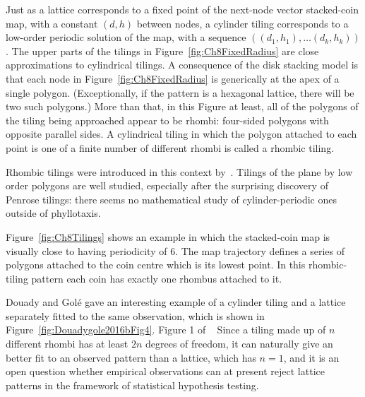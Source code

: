 Just as a lattice corresponds to a fixed point of the next-node vector stacked-coin map, with a constant $(d,h)$ between nodes, a cylinder tiling corresponds to a low-order periodic solution of the map, with a sequence $((d_1,h_1),\ldots (d_k,h_k) )$. The upper parts of the tilings in Figure~\ref{fig:Ch8FixedRadius} are close approximations to cylindrical tilings.
A consequence of the disk stacking model is that each node in Figure~\ref{fig:Ch8FixedRadius} is generically at the apex of a single polygon. (Exceptionally, if the pattern is a hexagonal lattice, there will be two such polygons.)
More than that, in this Figure at least, all of the polygons of the tiling being approached appear to be rhombi: four-sided polygons with opposite parallel sides.%
A cylindrical tiling in which the polygon attached to each point is one of a finite number of different rhombi is called a rhombic tiling.%


	Rhombic tilings were introduced in this context by~\cite{atelaRhombicTilingsPrimordia2017}.
	Tilings of the plane by low order polygons are well studied, especially after the surprising discovery of Penrose tilings: there seems no mathematical study of cylinder-periodic ones outside of phyllotaxis.


Figure~\ref{fig:Ch8Tilings} shows an example in which the stacked-coin map is visually close to having periodicity of 6. The map trajectory defines a series of polygons attached to the coin centre which is its lowest point. In this rhombic-tiling pattern each coin has exactly one rhombus attached to it.

 




 Douady and Gol\'e gave an interesting example of a cylinder tiling and a lattice separately fitted to the same observation, which is shown in Figure~\ref{fig:Douadygole2016bFig4}.
 {Figure 1 of ~\autocite{atelaRhombicTilingsPrimordia2017}} 
 Since a tiling made up of $n$ different rhombi has at least $2n$ degrees of freedom, it can naturally give an better fit to an observed pattern than a lattice, which has $n=1$, and it is an open question whether empirical observations can at present reject lattice patterns in the framework of statistical hypothesis testing.%
 
